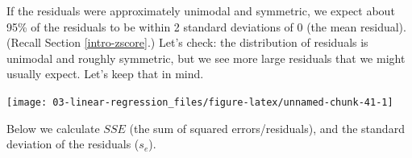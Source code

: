 \documentclass[
]{book}
\newenvironment{Shaded}{\begin{snugshade}}{\end{snugshade}}
\newcommand{\CommentTok}[1]{\textcolor[rgb]{0.56,0.35,0.01}{\textit{#1}}}
\newcommand{\DataTypeTok}[1]{\textcolor[rgb]{0.13,0.29,0.53}{#1}}
\newcommand{\DecValTok}[1]{\textcolor[rgb]{0.00,0.00,0.81}{#1}}
\newcommand{\KeywordTok}[1]{\textcolor[rgb]{0.13,0.29,0.53}{\textbf{#1}}}
\newcommand{\NormalTok}[1]{#1}
\newcommand{\OperatorTok}[1]{\textcolor[rgb]{0.81,0.36,0.00}{\textbf{#1}}}
\newcommand{\StringTok}[1]{\textcolor[rgb]{0.31,0.60,0.02}{#1}}
\begin{document}
If the residuals were approximately unimodal and symmetric, we expect about 95\% of the residuals to be within 2 standard deviations of 0 (the mean residual). (Recall Section \ref{intro-zscore}.) Let's check: the distribution of residuals is unimodal and roughly symmetric, but we see more large residuals that we might usually expect. Let's keep that in mind.

\begin{Shaded}
\end{Shaded}

\begin{center}\texttt{[image: 03-linear-regression\_files/figure-latex/unnamed-chunk-41-1]} \end{center}

Below we calculate \(SSE\) (the sum of squared errors/residuals), and the standard deviation of the residuals (\(s_e\)).

\begin{Shaded}
\end{Shaded}
\end{document}
